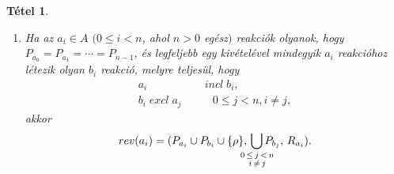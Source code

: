 \documentclass[12pt]{article}
\theoremstyle{definition}
\theoremstyle{remark}
\theoremstyle{plain}
\newtheorem*{theorem*}{Tétel}
\newcommand{\excl}{\; \textit{excl} \;}
\newcommand{\incl}{\; \textit{incl} \;}
\newcommand{\reaction}[3]{
    (#1, \, #2, \, #3)
}
\begin{document}
\begin{theorem*}
\begin{enumerate}[label={(\arabic*)}]
            \item
            Ha az $a_{i} \in A$ $(0 \leq i < n$, ahol $n > 0$ egész$)$ reakciók olyanok, hogy $P_{a_{0}} = P_{a_{1}} = \cdots = P_{n - 1}$, és legfeljebb egy kivételével mindegyik $a_{i}$ reakcióhoz létezik olyan $b_{i}$ reakció, melyre teljesül, hogy
            \begin{align*}
                a_{i} &\incl b_{i}, \\
                b_{i} \excl a_{j} \quad & \quad 0 \leq j < n, i \neq j,
            \end{align*}
            akkor
            \begin{align*}
                rev(a_{i}) = \reaction{P_{a_{i}} \cup P_{b_{i}} \cup \{ \rho \}}{\bigcup\limits_{\substack{ \mathllap{0 \, \leq} \, j \, \mathrlap{< \, n} \\ \mathllap{i} \, \neq \, \mathrlap{j} }}P_{b_{j}}}{R_{a_{i}}}.
            \end{align*}
        \end{enumerate}
    \end{theorem*}
\end{document}
